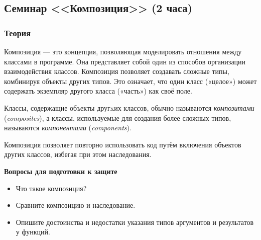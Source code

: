 \subsection{Семинар <<Композиция>> (2 часа)}

\subsubsection*{Теория}



\begin{center}
\end{center}

Композиция — это концепция, позволяющая моделировать отношения между классами в программе. Она представляет собой один из способов организации взаимодействия классов. Композиция позволяет создавать сложные типы, комбинируя объекты других типов. Это означает, что один класс («целое») может содержать экземпляр другого класса («часть») как своё поле.

Классы, содержащие объекты другxих классов, обычно называются \emph{композитами} (\emph{composites}), а классы, используемые для создания более сложных типов, называются \emph{компонентами} (\emph{components}).

Композиция позволяет повторно использовать код путём включения объектов других классов, избегая при этом наследования.

\textbf{Вопросы для подготовки к защите}

\begin{itemize}
\item Что такое композиция?
    \item Сравните композицию и наследование.
    \item Опишите достоинства и недостатки указания типов аргументов и результатов у функций.
\end{itemize}

